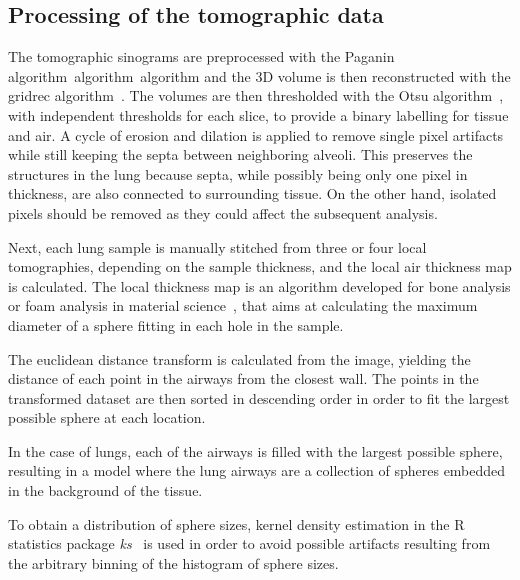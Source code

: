 
\subsection{Processing of the tomographic data}\label{sec:tomoprocessing}
The tomographic sinograms are preprocessed with the Paganin
algorithm~\cite{Paganin_2002}algorithm~algorithm and
the 3D volume is then reconstructed with the gridrec
algorithm~\cite{Marone:pp5022}. The volumes
are then thresholded with the Otsu algorithm~\cite{Otsu_1979}, with independent thresholds
for each slice, to provide a binary labelling for tissue and air. A cycle of
erosion and dilation is applied to remove single pixel artifacts while still
keeping the septa between neighboring alveoli. This preserves the structures
in the lung because septa, while possibly being only one pixel in thickness,
are also connected to surrounding tissue. On the other hand, isolated pixels
should be removed as they could affect the subsequent analysis.

Next, each lung sample is manually stitched from three or four local
tomographies, depending on the sample thickness, and the local air thickness
map is calculated. The local thickness map is an algorithm developed for
bone analysis or foam analysis in material science~\cite{6778077}, that aims
at calculating the maximum diameter of a sphere fitting in each hole in the
sample.

The euclidean distance transform is calculated from the image, yielding the
distance of each point in the airways from the closest wall. The points in
the transformed dataset are then sorted in descending order in order to fit
the largest possible sphere at each location.

In the case of lungs, each of the airways is filled with the largest possible
sphere, resulting in a model where the lung airways are a collection of
spheres embedded in the background of the tissue.

To obtain a distribution of sphere sizes, kernel density estimation in the R
statistics package \emph{ks}~\cite{JSSv021i07} is used in order to avoid possible artifacts
resulting from the arbitrary binning of the histogram of sphere sizes.


